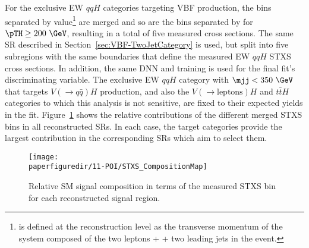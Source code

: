 For the exclusive \TwoJet EW $qqH$ categories targeting VBF production, the bins separated by \pTHjj value\footnote{\pTHjj is defined at the reconstruction level as the transverse momentum of the system composed of the two leptons + \met + two leading jets in the event.} are merged and so are the bins separated by \mjj for $\pTH \ge200~\GeV$, resulting in a total of five measured cross sections.
The same SR described in Section~\ref{sec:VBF-TwoJetCategory} is used, but split into five subregions with the same boundaries that define the measured EW $qqH$ STXS cross sections. In addition, the same DNN and training is used for the final fit's discriminating variable.
The exclusive \TwoJet EW $qqH$ category with $\mjj < 350~\GeV$ that targets $V(\rightarrow q\bar{q})H$ production, and also the $V(\to \textrm{leptons})H$ and $t\bar{t}H$ categories to which this analysis is not sensitive, are fixed to their expected yields in the fit.
Figure~\ref{fig:STXS_Composition} shows the relative contributions of the different merged STXS bins in all reconstructed SRs.
In each case, the target categories provide the largest contribution in the corresponding SRs which aim to select them.


\begin{figure}[!h]
  \centering
    \texttt{[image: \\paperfiguredir/11-POI/STXS\_CompositionMap]}
  \caption{
    Relative SM signal composition in terms of the measured STXS bin for each reconstructed signal region.
    \label{fig:STXS_Composition}
  }
\end{figure}
